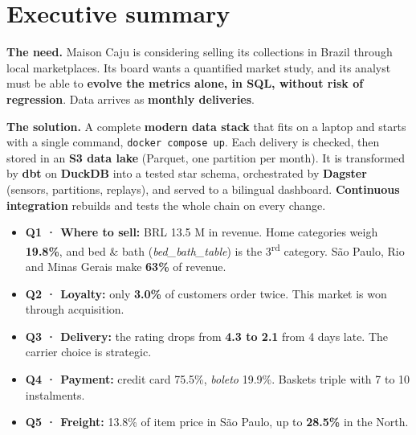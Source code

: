 \documentclass[11pt, a4paper, oneside, headings=normal, numbers=noenddot, DIV=12]{scrartcl}
\begin{document}
\begingroup
{}
\setcounter{tocdepth}{2}
\tableofcontents
\endgroup
\clearpage

\section{Executive summary}\label{sec:summary}

\textbf{The need.} Maison Caju is considering selling its collections in Brazil through local marketplaces. Its board wants a quantified
market study, and its analyst must be able to \textbf{evolve the metrics alone, in SQL, without risk of regression}.
Data arrives as \textbf{monthly deliveries}.

\textbf{The solution.} A complete \textbf{modern data stack} that fits on a laptop and starts with a single command, \texttt{docker compose up}.
Each delivery is checked, then stored in an \textbf{S3 data lake} (Parquet, one partition per month). It is transformed by \textbf{dbt} on
\textbf{DuckDB} into a tested star schema, orchestrated by \textbf{Dagster} (sensors, partitions, replays), and served to a bilingual
dashboard. \textbf{Continuous integration} rebuilds and tests the whole chain on every change.


\begin{keybox}
\begin{itemize}[leftmargin=1.2em]
  \item \textbf{Q1 · Where to sell:} BRL 13.5 M in revenue. Home categories weigh \textbf{19.8\%}, and bed \& bath
        (\emph{bed\_bath\_table}) is the 3\textsuperscript{rd} category. São Paulo, Rio and Minas Gerais make \textbf{63\%} of revenue.
  \item \textbf{Q2 · Loyalty:} only \textbf{3.0\%} of customers order twice. This market is won through acquisition.
  \item \textbf{Q3 · Delivery:} the rating drops from \textbf{4.3 to 2.1} from 4 days late. The carrier choice is strategic.
  \item \textbf{Q4 · Payment:} credit card 75.5\%, \emph{boleto} 19.9\%. Baskets triple with 7 to 10 instalments.
  \item \textbf{Q5 · Freight:} 13.8\% of item price in São Paulo, up to \textbf{28.5\%} in the North.
\end{itemize}
\end{keybox}
\end{document}
